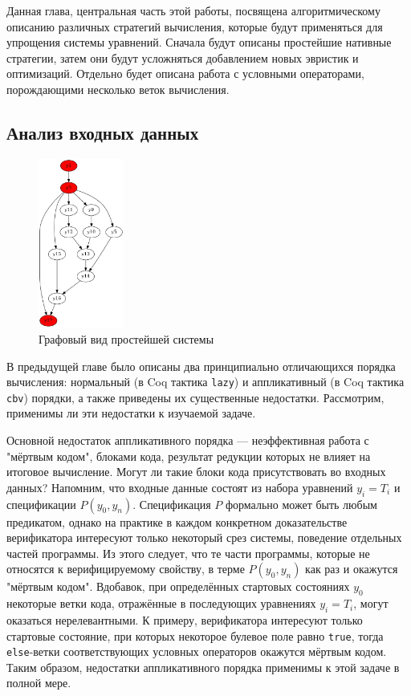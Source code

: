 \documentclass[../diploma.tex]{subfiles}
\begin{document}
\label{sec:2}
\graphicspath{ {../images/} }

Данная глава, центральная часть этой работы, посвящена алгоритмическому описанию различных стратегий вычисления, которые будут применяться для упрощения системы уравнений. Сначала будут описаны простейшие нативные стратегии, затем они будут усложняться добавлением новых эвристик и оптимизаций. Отдельно будет описана работа с условными операторами, порождающими несколько веток вычисления.

\subsection{Анализ входных данных}

\begin{figure}
    \centering
    \includegraphics[width=0.25\textwidth]{graph_simple1.jpeg}
    \caption{Графовый вид простейшей системы}\label{graph_simple1}
\end{figure}

В предыдущей главе было описаны два принципиально отличающихся порядка вычисления: нормальный (в Coq тактика \texttt{lazy}) и аппликативный (в Coq тактика \texttt{cbv}) порядки, а также приведены их существенные недостатки. Рассмотрим, применимы ли эти недостатки к изучаемой задаче.

Основной недостаток аппликативного порядка --- неэффективная работа с "мёртвым кодом", блоками кода, результат редукции которых не влияет на итоговое вычисление. Могут ли такие блоки кода присутствовать во входных данных? Напомним, что входные данные состоят из набора уравнений $y_i = T_i$ и спецификации $P(y_0, y_n)$. Спецификация $P$ формально может быть любым предикатом, однако на практике в каждом конкретном доказательстве верификатора интересуют только некоторый срез системы, поведение отдельных частей программы. Из этого следует, что те части программы, которые не относятся к верифицируемому свойству, в терме $P(y_0, y_n)$ как раз и окажутся "мёртвым кодом". Вдобавок, при определённых стартовых состояниях $y_0$ некоторые ветки кода, отражённые в последующих уравнениях $y_i = T_i$, могут оказаться нерелевантными. К примеру, верификатора интересуют только стартовые состояние, при которых некоторое булевое поле равно \texttt{true}, тогда \texttt{else}-ветки соответствующих условных операторов окажутся мёртвым кодом. Таким образом, недостатки аппликативного порядка применимы к этой задаче в полной мере.
\end{document}
